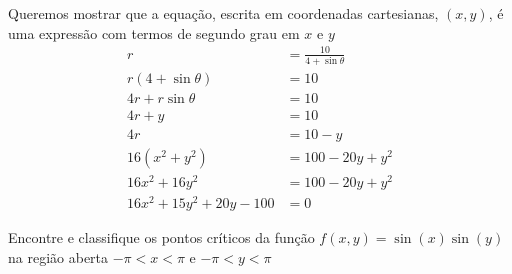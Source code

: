 \documentclass[a4paper,12pt,fleqn]{article}
\begin{document}
\begin{answer}
  Queremos mostrar que a equação, escrita em coordenadas cartesianas, $(x, y)$,
  é uma expressão com termos de segundo grau em $x$ e $y$
  \begin{align*}
    r                         & = \frac{10}{4 + \sin\theta} \\
    r(4 + \sin\theta)         & = 10                        \\
    4r + r\sin\theta          & = 10                        \\
    4r + y                    & = 10                        \\
    4r                        & = 10 - y                    \\
    16\left(x^2 + y^2\right)  & = 100 - 20y + y^2           \\
    16x^2 + 16y^2             & = 100 - 20y + y^2           \\
    16x^2 + 15y^2 + 20y - 100 & = 0
  \end{align*}
\end{answer}

Encontre e classifique os pontos críticos da função
\(
  f(x, y) = \sin(x)\sin(y)
\)
na região aberta $-\pi<x<\pi$ e  $-\pi<y<\pi$
\clearpagequestiononly
\end{document}
